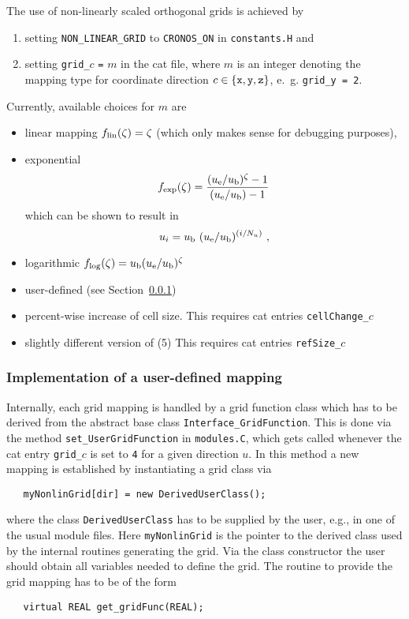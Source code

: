 The use of non-linearly scaled orthogonal grids is achieved by
\begin{enumerate}
\item setting {\tt NON\_LINEAR\_GRID} to {\tt CRONOS\_ON} in
  {\tt constants.H} and
\item setting \verb+grid_+$c$ {\tt =} $m$ in the cat file, where $m$ is
  an integer denoting the mapping type for coordinate direction
  $c \in {\{\tt x,y,z} \}$, e.~g. \verb+grid_y = 2+.
\end{enumerate}
% 
Currently, available choices for $m$ are
\begin{itemize}
\item[0:] linear mapping $f_{\rm lin}(\zeta)=\zeta$ (which only makes sense
  for debugging purposes),
\item[1:] exponential
  \begin{equation}
    f_{\rm exp}(\zeta) =
    \frac{(u_{\rm e}/u_{\rm b})^{\zeta}-1}{(u_{\rm e}/u_{\rm b})-1}
  \end{equation}
  which can be shown to result in
  \begin{equation}
    u_i = u_{\rm b} \ (u_{\rm e}/u_{\rm b})^{(i/N_u)} \ ,
  \end{equation}
\item[2:] logarithmic $f_{\rm log}(\zeta)
= u_{\rm b} (u_{\rm e}/u_{\rm b})^{\zeta}$
\item[4:] user-defined (see Section~\ref{sec:user-mapping})
\item[5:] percent-wise increase of cell size.
This requires cat entries \verb+cellChange_+$c$

\item[6:] slightly different version of (5)
This requires cat entries \verb+refSize_+$c$
\end{itemize}


\subsubsection{Implementation of a user-defined mapping}
\label{sec:user-mapping}

Internally, each grid mapping is handled by a grid function class which
has to be derived from the abstract base class
\verb+Interface_GridFunction+.
This is done via the method \verb+set_UserGridFunction+ in
{\tt modules.C}, which gets called whenever the cat entry
\verb+grid_+$c$ is set to {\tt 4} for a given direction $u$.
In this method a new mapping is established by instantiating a grid class via
\begin{verbatim}
   myNonlinGrid[dir] = new DerivedUserClass();
\end{verbatim}
where the class \verb+DerivedUserClass+ has to be supplied by the
user, e.g., in one of the usual module files. Here \verb+myNonlinGrid+
is the pointer to the derived class used by the internal routines
generating the grid. Via the class constructor the user should obtain all
variables needed to define the grid. The routine to provide the grid
mapping has to be of the form
\begin{verbatim}
   virtual REAL get_gridFunc(REAL);
\end{verbatim}

